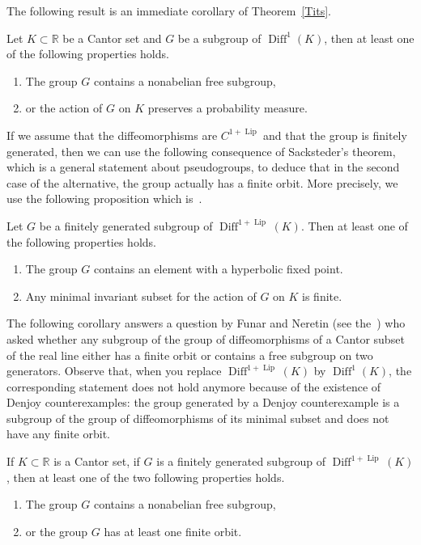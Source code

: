 \documentclass[10pt]{amsart}
\theoremstyle{definition}\newtheorem{defi}[theo]{Definition}\newtheorem{rema}[theo]{Remark}\newtheorem{exam}[theo]{Example}\newtheorem{exem}[theo]{Example}\newtheorem{nota}[theo]{Notation}
\DeclareMathOperator{\Diff}{Diff}
\DeclareMathOperator{\Lip}{Lip}
\newcommand{\R}{\mathbb{R}}
\newcounter{setofcase}
\newcounter{case}[setofcase]
\begin{document}
The following result is an immediate corollary of Theorem~\ref{Tits}.

\begin{coro}
Let $K\subset \R$ be a Cantor set and $G$ be a subgroup of $\Diff^1(K)$, then at least one of the following properties holds.
\begin{enumerate}
\item\label{coro1.5.1} The group $G$ contains a nonabelian free subgroup,
\item\label{coro1.5.2} or the action of $G$ on $K$ preserves a probability measure.
\end{enumerate}
\end{coro}

If we assume that the diffeomorphisms are $C^{1+\Lip}$ and that the group is finitely generated, then we can use the following consequence of Sacksteder's theorem, which is a general statement about pseudogroups, to deduce that in the second case of the alternative, the group actually has a finite orbit. More precisely, we use the following proposition which is~\cite[Proposition~3.2]{MM}.


\begin{prop}\label{SackCantor}
Let $G$ be a finitely generated subgroup of $\Diff^{1+\Lip}(K)$. Then at least one of the following properties holds.
\begin{enumerate}
\item\label{prop1.6.1} The group $G$ contains an element with a hyperbolic fixed point.
\item\label{prop1.6.2} Any minimal invariant subset for the action of $G$ on $K$ is finite.
\end{enumerate}
\end{prop}


The following corollary answers a question by Funar and Neretin (see the~\cite[last section]{FN}) who asked whether any subgroup of the group of diffeomorphisms of a Cantor subset of the real line either has a finite orbit or contains a free subgroup on two generators. Observe that, when you replace $\Diff^{1+\Lip}(K)$ by $\Diff^1(K)$, the corresponding statement does not hold anymore because of the existence of Denjoy counterexamples: the group generated by a Denjoy counterexample is a subgroup of the group of diffeomorphisms of its minimal subset and does not have any finite orbit.

\begin{coro}
If $K\subset \R$ is a Cantor set, if $G$ is a finitely generated subgroup of $\Diff^{1+\Lip}(K)$, then at least one of the two following properties holds.
\begin{enumerate}
\item The group $G$ contains a nonabelian free subgroup,
\item or the group $G$ has at least one finite orbit.
\end{enumerate}
\end{coro}
\end{document}
